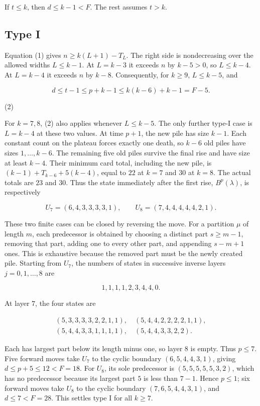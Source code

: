 \documentclass[11pt,a4paper]{article}
\begin{document}
If $t\le k$, then $d\le k-1<F$. The rest assumes $t>k$.

\subsection{Type I}

Equation (1) gives $n\ge k(L+1)-T_L$. The right side is nondecreasing over the allowed widths $L\le k-1$. At $L=k-3$ it exceeds $n$ by $k-5>0$, so $L\le k-4$. At $L=k-4$ it exceeds $n$ by $k-8$. Consequently, for $k\ge9$, $L\le k-5$, and

\[
d\le t-1\le p+k-1\le k(k-6)+k-1=F-5.
\]

(2)

For $k=7,8$, (2) also applies whenever $L\le k-5$. The only further type-I case is $L=k-4$ at these two values. At time $p+1$, the new pile has size $k-1$. Each constant count on the plateau forces exactly one death, so $k-6$ old piles have sizes $1,\ldots,k-6$. The remaining five old piles survive the final rise and have size at least $k-4$. Their minimum card total, including the new pile, is $(k-1)+T_{k-6}+5(k-4)$, equal to $22$ at $k=7$ and $30$ at $k=8$. The actual totals are $23$ and $30$. Thus the state immediately after the first rise, $B^p(\lambda)$, is respectively

\[
U_7=(6,4,3,3,3,3,1),\qquad U_8=(7,4,4,4,4,4,2,1).
\]

These two finite cases can be closed by reversing the move. For a partition $\mu$ of length $m$, each predecessor is obtained by choosing a distinct part $s\ge m-1$, removing that part, adding one to every other part, and appending $s-m+1$ ones. This is exhaustive because the removed part must be the newly created pile. Starting from $U_7$, the numbers of states in successive inverse layers $j=0,1,\ldots,8$ are

\[
1,1,1,1,2,3,4,4,0.
\]

At layer $7$, the four states are

\[
\begin{gathered}
(5,3,3,3,3,2,2,1,1),\quad(5,4,4,2,2,2,2,1,1),\\
(5,4,4,3,3,1,1,1,1),\quad(5,4,4,3,3,2,2).
\end{gathered}
\]

Each has largest part below its length minus one, so layer $8$ is empty. Thus $p\le7$. Five forward moves take $U_7$ to the cyclic boundary $(6,5,4,4,3,1)$, giving $d\le p+5\le12<F=18$. For $U_8$, its sole predecessor is $(5,5,5,5,5,3,2)$, which has no predecessor because its largest part $5$ is less than $7-1$. Hence $p\le1$; six forward moves take $U_8$ to the cyclic boundary $(7,6,5,4,4,3,1)$, and $d\le7<F=28$. This settles type I for all $k\ge7$.
\end{document}
